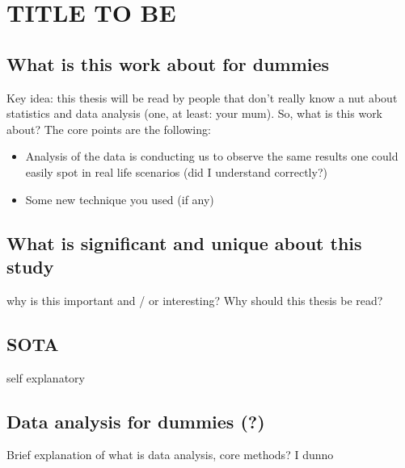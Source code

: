 \chapter{TITLE TO BE}

\section{What is this work about for dummies}
Key idea: this thesis will be read by people that don't really know a nut about statistics and data analysis (one, at least: your mum). 
So, what is this work about? 
The core points are the following:
\begin{itemize}
    \item Analysis of the data is conducting us to observe the same results one could easily spot in real life scenarios (did I understand correctly?)
    \item Some new technique you used (if any)
\end{itemize}
\section{What is significant and unique about this study}
why is this important and / or interesting? Why should this thesis be read?
\section{SOTA}
self explanatory
\section{Data analysis for dummies (?)}
Brief explanation of what is data analysis, core methods? I dunno
